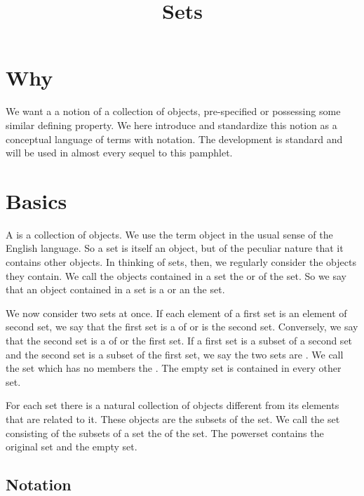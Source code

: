 




\title{Sets}

\section{Why}

We want a a notion of a collection of objects, pre-specified or possessing some similar defining property.
We here introduce and standardize this notion as a conceptual language of terms with notation.
The development is standard and will be used in almost every sequel to this pamphlet.

\section{Basics}

A  is a collection of objects.
We use the term object in the usual sense of the English language.
So a set is itself an object, but of the peculiar nature that it contains other objects.
In thinking of sets, then, we regularly consider the objects they contain.
We call the objects contained in a set the  or  of the set.
So we say that an object contained in a set is a  or an  the set.

We now consider two sets at once.
If each element of a first set is an element of second set, we say that the first set is a  of or is  the second set.
Conversely, we say that the second set is a  of or  the first set.
If a first set is a subset of a second set and the second set is a subset of the first set, we say the two sets are .
We call the set which has no members the .
The empty set is contained in every other set.

For each set there is a natural collection of objects different from its elements that are related to it.
These objects are the subsets of the set.
We call the set consisting of the subsets of a set the  of the set.
The powerset contains the original set and the empty set.

\subsection{Notation}

